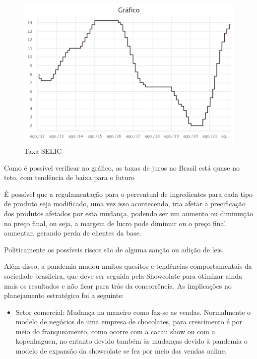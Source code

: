 \documentclass[
	12pt,				%
	openright,			%
	oneside,			%
	a4paper,			%
	english,			%
	french,				%
	spanish,			%
	brazil				%
	]{abntex2}
\begin{document}
\begin{figure}[H]
\begin{center}
\caption{Taxa SELIC}
\includegraphics[scale=0.2]{WhatsApp Image 2022-08-25 at 20.37.35 (1).jpeg} 
\end{center}
\end{figure}


Como é possível verificar no gráfico, as taxas de juros no Brasil está quase no teto, com tendência de baixa para o futuro

	É possível que a regulamentação para o percentual de ingredientes para cada tipo de produto seja modificado, uma vez isso acontecendo, iria afetar a precificação dos produtos afetados por esta mudança, podendo ser um aumento ou diminuição no preço final, ou seja, a margem de lucro pode diminuir ou o preço final aumentar, gerando perda de clientes da base.

	Politicamente os possíveis riscos são de alguma sanção ou adição de leis.

	Além disso, a pandemia mudou muitos quesitos e tendências comportamentais da sociedade brasileira, que deve ser seguida pela Showcolate para otimizar ainda mais os resultados e não ficar para trás da concorrência. As implicações no planejamento estratégico foi a seguinte:

\begin{itemize}
\item Setor comercial: Mudança na maneiro como faz-se as vendas. Normalmente o modelo de negócios de uma empresa de chocolates, para crescimento é por meio do franqueamento, como ocorre com a cacau show ou com a kopenhaguen, no entanto devido também às mudanças devido à pandemia o modelo de expansão da showcolate se fez por meio das vendas online.
\end{itemize}
\end{document}
